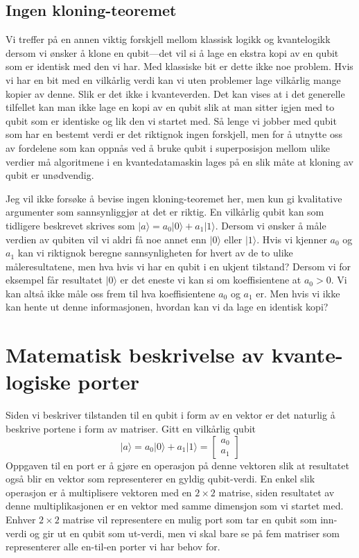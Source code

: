 \subsection{Ingen kloning-teoremet}
Vi treffer på en annen viktig forskjell mellom klassisk logikk og kvantelogikk dersom vi ønsker å klone en qubit---det vil si å lage en ekstra kopi av en qubit som er identisk med den vi har. Med klassiske bit er dette ikke noe problem. Hvis vi har en bit med en vilkårlig verdi kan vi uten problemer lage vilkårlig mange kopier av denne. Slik er det ikke i kvanteverden. Det kan vises at i det generelle tilfellet kan man ikke lage en kopi av en qubit slik at man sitter igjen med to qubit som er identiske og lik den vi startet med. Så lenge vi jobber med qubit som har en bestemt verdi er det riktignok ingen forskjell, men for å utnytte oss av fordelene som kan oppnås ved å bruke qubit i superposisjon mellom ulike verdier må algoritmene i en kvantedatamaskin lages på en slik måte at kloning av qubit er unødvendig.

Jeg vil ikke forsøke å bevise ingen kloning-teoremet her, men kun gi kvalitative argumenter som sannsynliggjør at det er riktig. En vilkårlig qubit kan som tidligere beskrevet skrives som $|a\rangle = a_0|0\rangle + a_1|1\rangle$. Dersom vi ønsker å måle verdien av qubiten vil vi aldri få noe annet enn $|0\rangle$ eller $|1\rangle$. Hvis vi kjenner $a_0$ og $a_1$ kan vi riktignok beregne sannsynligheten for hvert av de to ulike måleresultatene, men hva hvis vi har en qubit i en ukjent tilstand? Dersom vi for eksempel får resultatet $|0\rangle$ er det eneste vi kan si om koeffisientene at $a_0>0$. Vi kan altså ikke måle oss frem til hva koeffisientene $a_0$ og $a_1$ er. Men hvis vi ikke kan hente ut denne informasjonen, hvordan kan vi da lage en identisk kopi? 

\section{Matematisk beskrivelse av kvante-logiske porter}
Siden vi beskriver tilstanden til en qubit i form av en vektor er det naturlig å beskrive portene i form av matriser. Gitt en vilkårlig qubit 
\begin{displaymath}
	|a\rangle = a_0 |0\rangle + a_1|1\rangle = \left[\begin{array}{r} a_0 \\ a_1 \end{array}\right]
\end{displaymath}
Oppgaven til en port er å gjøre en operasjon på denne vektoren slik at resultatet også blir en vektor som representerer en gyldig qubit-verdi. En enkel slik operasjon er å multiplisere vektoren med en $2\times 2$ matrise, siden resultatet av denne multiplikasjonen er en vektor med samme dimensjon som vi startet med. Enhver $2\times2$ matrise vil representere en mulig port som tar en qubit som inn-verdi og gir ut en qubit som ut-verdi, men vi skal bare se på fem matriser som representerer alle en-til-en porter vi har behov for. 

